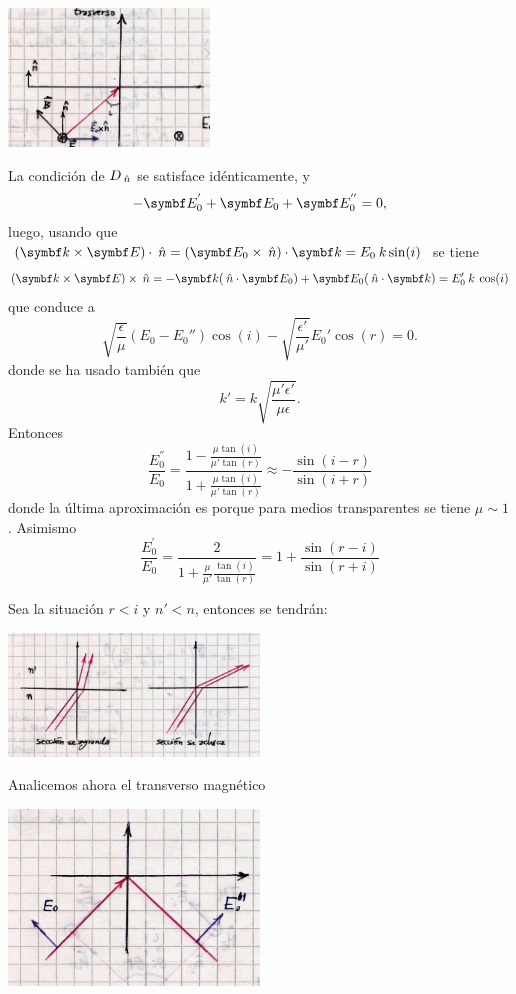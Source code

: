 \documentclass[10pt,oneside]{CBFT_book}
\begin{document}
\includegraphics[width=0.4\textwidth]{images/fig_ft1_ondas_TE.jpg} 

La condición de $D_{\:\hat{n}}$ se satisface idénticamente, y
\[
	- \vb{E}_0^{'} + \vb{E}_0 + \vb{E}_0^{''} = 0,
\]
luego, usando que $ (\pv{k}{E})\cdot\nver= (\vb{E}_0\times\nver)\cdot\vb{k} = E_0 \: k \sin(i)$
se tiene
\[
	(\pv{k}{E})\times\nver = -\vb{k} (\nver\cdot\vb{E}_0) + \vb{E}_0 (\nver\cdot\vb{k}) =
	E_0'\: k \: \cos( i )
\]
que conduce a
\[
	\sqrt{\frac{\epsilon}{\mu}} (E_0 - E_0'') \cos( i ) -
	\sqrt{\frac{\epsilon'}{\mu'}} E_0' \cos( r ) = 0.
\]
donde se ha usado también que
\[
	k'= k \sqrt{\frac{\mu'\epsilon'}{\mu\epsilon}}.
\]
Entonces
\[
	\frac{E_0^{''}}{E_0} = \frac{1 - \frac{\mu\tan(i)}{\mu'\tan(r)} }{ 1 + \frac{\mu\tan(i)}{\mu'\tan(r)} } 
	\approx -\frac{\sin(i-r)}{\sin(i+r)}
\]
donde la última aproximación es porque para medios transparentes se tiene $\mu \sim 1$.
Asimismo
\[
	\frac{E_0^{'}}{E_0} = \frac{ 2 }{1 + \frac{\mu}{\mu'} \frac{\tan(i)}{\tan(r)} } =
	1 + \frac{\sin(r-i)}{\sin(r+i)}
\]

Sea la situación $ r < i $ y $ n' < n $, entonces se tendrán:

\includegraphics[width=0.5\textwidth]{images/fig_ft1_ondas_TE2.jpg} 

Analicemos ahora el transverso magnético

\includegraphics[width=0.5\textwidth]{images/fig_ft1_ondas_TM.jpg} 
\end{document}
